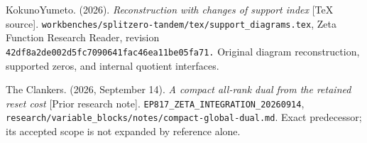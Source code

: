 KokunoYumeto. (2026). \emph{Reconstruction with changes of support index} {[}TeX source{]}. \nolinkurl{workbenches/splitzero-tandem/tex/support_diagrams.tex}, Zeta Function Research Reader, revision \nolinkurl{42df8a2de002d5fc7090641fac46ea11be05fa71.} Original diagram reconstruction, supported zeros, and internal quotient interfaces.

The Clankers. (2026, September 14). \emph{A compact all-rank dual from the retained reset cost} {[}Prior research note{]}. \nolinkurl{EP817_ZETA_INTEGRATION_20260914}, \nolinkurl{research/variable_blocks/notes/compact-global-dual.md}. Exact predecessor; its accepted scope is not expanded by reference alone.
